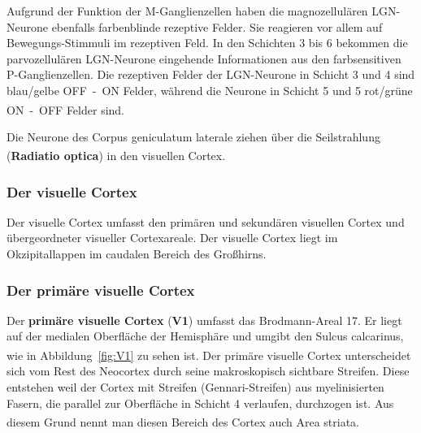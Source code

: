 \documentclass[12pt,a4paper,pdftex]{article}
\begin{document}
Aufgrund der Funktion der M-Ganglienzellen haben die magnozellulären LGN-Neurone ebenfalls farbenblinde rezeptive Felder. Sie reagieren vor allem auf Bewegungs-Stimmuli im rezeptiven Feld. In den Schichten 3 bis 6 bekommen die parvozellulären LGN-Neurone eingehende Informationen aus den farbsensitiven P-Ganglienzellen. Die rezeptiven Felder der LGN-Neurone in Schicht 3 und 4 sind blau/gelbe OFF~-~ON Felder, während die Neurone in Schicht 5 und 5 rot/grüne ON~-~OFF Felder sind. \textsuperscript{\cite[18]{smith2008biology}}

Die Neurone des Corpus geniculatum laterale ziehen über die Seilstrahlung (\textbf{Radiatio optica})  in den visuellen Cortex. \textsuperscript{\cite[8.1]{trepel2011neuroanatomie}}


\subsubsection*{Der visuelle Cortex}

Der visuelle Cortex umfasst den primären und sekundären visuellen Cortex und übergeordneter visueller Cortexareale. Der visuelle Cortex liegt im Okzipitallappen im caudalen Bereich des Großhirns. 


\subsubsection*{Der primäre visuelle Cortex}

Der \textbf{primäre visuelle Cortex} (\textbf{V1})  umfasst das Brodmann-Areal 17. Er liegt auf der medialen Oberfläche der Hemisphäre und umgibt den Sulcus calcarinus, wie in Abbildung~\ref{fig:V1} zu sehen ist. \textsuperscript{\cite[10]{neurowissenschaften_baer}} 
Der primäre visuelle Cortex unterscheidet sich vom Rest des Neocortex durch seine makroskopisch sichtbare Streifen. Diese entstehen weil der Cortex mit Streifen (Gennari-Streifen) aus myelinisierten Fasern, die parallel zur Oberfläche in Schicht 4 verlaufen, durchzogen ist. Aus diesem Grund nennt man diesen Bereich des Cortex auch Area striata. \textsuperscript{\cite[18]{smith2008biology}}
\end{document}
